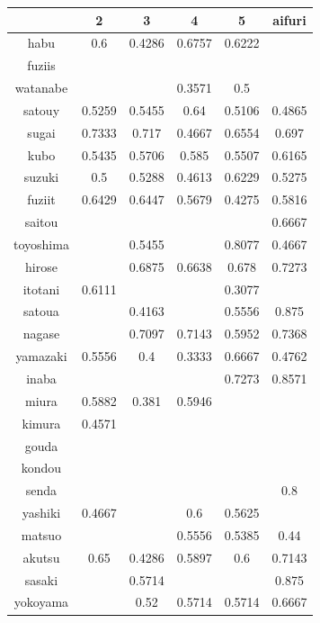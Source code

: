 \documentclass[11pt,a4paper,dvipdfmx]{jsarticle}
\begin{document}
\begin{tabular}{c||c|c|c|c|c|}
    & 2 & 3 & 4 & 5 & aifuri \\ \hline
    habu & 0.6 & 0.4286 & 0.6757 & 0.6222 &  \\
    fuziis &  &  &  &  &  \\
    watanabe &  &  & 0.3571 & 0.5 &  \\
    satouy & 0.5259 & 0.5455 & 0.64 & 0.5106 & 0.4865 \\
    sugai & 0.7333 & 0.717 & 0.4667 & 0.6554 & 0.697 \\
    kubo & 0.5435 & 0.5706 & 0.585 & 0.5507 & 0.6165 \\
    suzuki & 0.5 & 0.5288 & 0.4613 & 0.6229 & 0.5275 \\
    fuziit & 0.6429 & 0.6447 & 0.5679 & 0.4275 & 0.5816 \\
    saitou &  &  &  &  & 0.6667 \\
    toyoshima &  & 0.5455 &  & 0.8077 & 0.4667 \\
    hirose &  & 0.6875 & 0.6638 & 0.678 & 0.7273 \\
    itotani & 0.6111 &  &  & 0.3077 &  \\
    satoua &  & 0.4163 &  & 0.5556 & 0.875 \\
    nagase &  & 0.7097 & 0.7143 & 0.5952 & 0.7368 \\
    yamazaki & 0.5556 & 0.4 & 0.3333 & 0.6667 & 0.4762 \\
    inaba &  &  &  & 0.7273 & 0.8571 \\
    miura & 0.5882 & 0.381 & 0.5946 &  &  \\
    kimura & 0.4571 &  &  &  &  \\
    gouda &  &  &  &  &  \\
    kondou &  &  &  &  &  \\
    senda &  &  &  &  & 0.8 \\
    yashiki & 0.4667 &  & 0.6 & 0.5625 &  \\
    matsuo &  &  & 0.5556 & 0.5385 & 0.44 \\
    akutsu & 0.65 & 0.4286 & 0.5897 & 0.6 & 0.7143 \\
    sasaki &  & 0.5714 &  &  & 0.875 \\
    yokoyama &  & 0.52 & 0.5714 & 0.5714 & 0.6667 \\
    
\end{tabular}
\\
\\
\\
\end{document}
